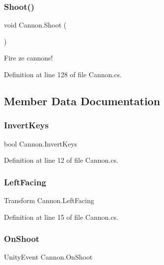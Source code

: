 \subsubsection{\texorpdfstring{Shoot()}{Shoot()}}
{\footnotesize\ttfamily void Cannon.\+Shoot (\begin{DoxyParamCaption}{ }\end{DoxyParamCaption})}



Fire ze cannons! 



Definition at line 128 of file Cannon.\+cs.



\subsection{Member Data Documentation}
\mbox{\label{class_cannon_a4b17c78dd58465371d81c31f19f0030c}} 
\subsubsection{\texorpdfstring{Invert\+Keys}{InvertKeys}}
{\footnotesize\ttfamily bool Cannon.\+Invert\+Keys}



Definition at line 12 of file Cannon.\+cs.

\mbox{\label{class_cannon_a8ea813a90bea970311f357c5d4cb10e7}} 
\subsubsection{\texorpdfstring{Left\+Facing}{LeftFacing}}
{\footnotesize\ttfamily Transform Cannon.\+Left\+Facing}



Definition at line 15 of file Cannon.\+cs.

\mbox{\label{class_cannon_a6be8bc50dab6d91351513655c7c4f304}} 
\subsubsection{\texorpdfstring{On\+Shoot}{OnShoot}}
{\footnotesize\ttfamily Unity\+Event Cannon.\+On\+Shoot}



